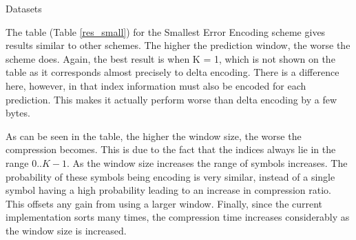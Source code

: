 \documentclass[a4paper,11pt]{report}
\begin{document}
\begin{section}{Datasets}
\begin{table}
\begin{center}
\end{center}
\caption{Compression information for \textbf{Smallest Error Encoding} using different prediction window parameters. The format is the same as in Table \ref{intres}.}
\label{res_small}
\end{table}

The table (Table \ref{res_small}) for the Smallest Error Encoding scheme gives results similar to other schemes. The higher the prediction window, the worse the scheme does. Again, the best result is when K = 1, which is not shown on the table as it corresponds almost precisely to delta encoding. There is a difference here, however, in that index information must also be encoded for each prediction. This makes it actually perform worse than delta encoding by a few bytes. 

As can be seen in the table, the higher the window size, the worse the compression becomes. This is due to the fact that the indices always lie in the range $0..K-1$. As the window size increases the range of symbols increases. The probability of these symbols being encoding is very similar, instead of a single symbol having a high probability leading to an increase in compression ratio. This offsets any gain from using a larger window. Finally, since the current implementation sorts many times, the compression time increases considerably as the window size is increased.


\end{section}
\end{document}
